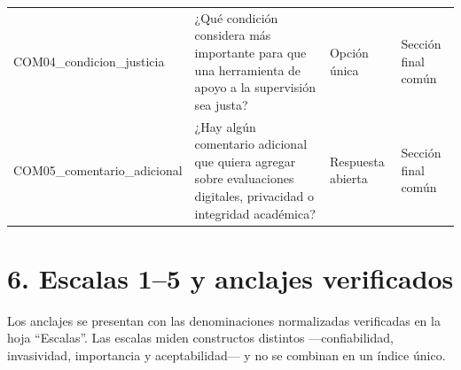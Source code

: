 \begin{center}
\begin{longtable}{@{}p{3.4cm}p{3.7cm}p{3.7cm}p{3.7cm}@{}}
COM04\_\allowbreak condicion\_\allowbreak justicia & ¿Qué condición considera más importante para que una herramienta de apoyo a la supervisión sea justa? & Opción única & Sección final común \\
COM05\_\allowbreak comentario\_\allowbreak adicional & ¿Hay algún comentario adicional que quiera agregar sobre evaluaciones digitales, privacidad o integridad académica? & Respuesta abierta & Sección final común \\
\bottomrule
\end{longtable}
\end{center}
\section*{6. Escalas 1--5 y anclajes verificados}
Los anclajes se presentan con las denominaciones normalizadas verificadas en la hoja ``Escalas''. Las escalas miden constructos distintos ---confiabilidad, invasividad, importancia y aceptabilidad--- y no se combinan en un índice único.

